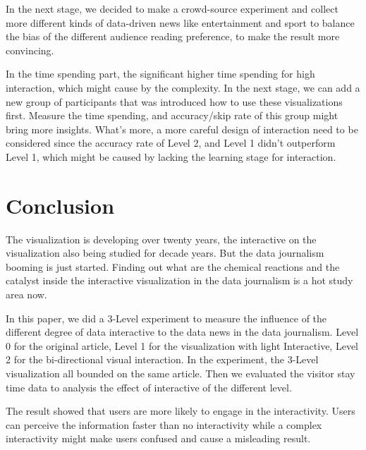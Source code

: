 \documentclass[9pt,journal,compsoc]{IEEEtran}
\begin{document}
In the next stage, we decided to make a crowd-source experiment and collect more different kinds of data-driven news like entertainment and sport to balance the bias of the different audience reading preference, to make the result more convincing.

In the time spending part, the significant higher time spending for high interaction, which might cause by the complexity. In the next stage, we can add a new group of participants that was introduced how to use these visualizations first. Measure the time spending, and accuracy/skip rate of this group might bring more insights. What's more, a more careful design of interaction need to be considered since the accuracy rate of Level 2, and Level 1 didn't outperform Level 1, which might be caused by lacking the learning stage for interaction.

\section{Conclusion}
\large
The visualization is developing over twenty years, the interactive on the visualization also being studied for decade years. But the data journalism booming is just started. Finding out what are the chemical reactions and the catalyst inside the interactive visualization in the data journalism is a hot study area now.

In this paper, we did a 3-Level experiment to measure the influence of the different degree of data interactive to the data news in the data journalism.  Level 0 for the original article, Level 1 for the visualization with light Interactive, Level 2 for the bi-directional visual interaction. In the experiment, the 3-Level visualization all bounded on the same article. Then we evaluated the visitor stay time data to analysis the effect of interactive of the different level.

The result showed that users are more likely to engage in the interactivity. Users can perceive the information faster than no interactivity while a complex interactivity might make users confused and cause a misleading result.
\end{document}
